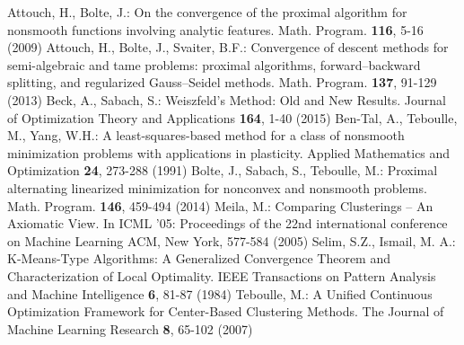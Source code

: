 \documentclass[12pt]{article}
\numberwithin{equation}{section}
\begin{document}

\clearpage

\begin{thebibliography}{99}
 Attouch, H., Bolte, J.: On the convergence of the proximal algorithm for nonsmooth functions involving analytic features. Math. Program. \textbf{116}, 5-16 (2009)
%
 Attouch, H., Bolte, J., Svaiter, B.F.: Convergence of descent methods for semi-algebraic and tame problems: proximal algorithms, forward–backward splitting, and regularized Gauss–Seidel methods. Math. Program. \textbf{137}, 91-129 (2013)
%
 Beck, A., Sabach, S.: Weiszfeld’s Method: Old and New Results. Journal of Optimization Theory and Applications \textbf{164}, 1-40 (2015)
%
 Ben-Tal, A., Teboulle, M., Yang, W.H.: A least-squares-based method for a class of nonsmooth minimization problems with applications in plasticity. Applied Mathematics and Optimization \textbf{24}, 273-288 (1991)
%
 Bolte, J., Sabach, S., Teboulle, M.: Proximal alternating linearized minimization for nonconvex and nonsmooth problems. Math. Program. \textbf{146}, 459-494 (2014)
%
 Meila, M.: Comparing Clusterings – An Axiomatic View. In ICML '05: Proceedings of the 22nd international conference on Machine Learning ACM, New York, 577-584 (2005)
%
 Selim, S.Z., Ismail, M. A.: K-Means-Type Algorithms: A Generalized Convergence Theorem and Characterization of Local Optimality. IEEE Transactions on Pattern Analysis and Machine Intelligence \textbf{6}, 81-87 (1984)
%
 Teboulle, M.: A Unified Continuous Optimization Framework for Center-Based Clustering Methods. The Journal of Machine Learning Research \textbf{8}, 65-102 (2007)
\end{thebibliography}
\end{document}
